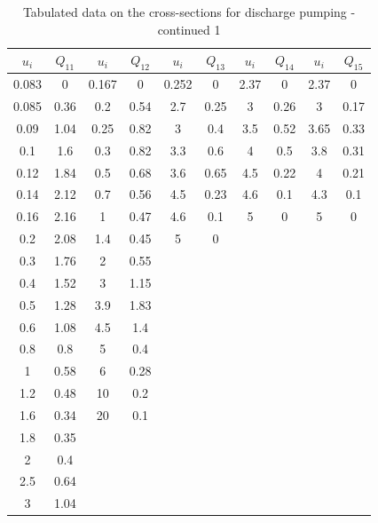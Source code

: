 \documentclass{report}
\begin{document}
\begin{table}
\centering
\caption{Tabulated data on the cross-sections for discharge pumping - continued 1}
\begin{tabular}{|c|c||c|c||c|c||c|c||c|c|}
\hline 
$u_i$ & $Q_{11}$ & $u_i$ & $Q_{12}$ & $u_i$ & $Q_{13}$ & $u_i$ & $Q_{14}$ & $u_i$ & $Q_{15}$ \\
\hline 
0.083 & 0    & 0.167 & 0    & 0.252 & 0    & 2.37 & 0    & 2.37 & 0    \\
0.085 & 0.36 & 0.2   & 0.54 & 2.7   & 0.25 & 3    & 0.26 & 3    & 0.17 \\
0.09  & 1.04 & 0.25  & 0.82 & 3     & 0.4  & 3.5  & 0.52 & 3.65 & 0.33 \\
0.1   & 1.6  & 0.3   & 0.82 & 3.3   & 0.6  & 4    & 0.5  & 3.8  & 0.31 \\
0.12  & 1.84 & 0.5   & 0.68 & 3.6   & 0.65 & 4.5  & 0.22 & 4    & 0.21 \\
0.14  & 2.12 & 0.7   & 0.56 & 4.5   & 0.23 & 4.6  & 0.1  & 4.3  & 0.1  \\
0.16  & 2.16 & 1     & 0.47 & 4.6   & 0.1  & 5    & 0    & 5    & 0    \\
0.2   & 2.08 & 1.4   & 0.45 & 5     & 0    &      &      &      &      \\
0.3   & 1.76 & 2     & 0.55 &       &      &      &      &      &      \\
0.4   & 1.52 & 3     & 1.15 &       &      &      &      &      &      \\
0.5   & 1.28 & 3.9   & 1.83 &       &      &      &      &      &      \\
0.6   & 1.08 & 4.5   & 1.4  &       &      &      &      &      &      \\
0.8   & 0.8  & 5     & 0.4  &       &      &      &      &      &      \\
1     & 0.58 & 6     & 0.28 &       &      &      &      &      &      \\
1.2   & 0.48 & 10    & 0.2  &       &      &      &      &      &      \\
1.6   & 0.34 & 20    & 0.1  &       &      &      &      &      &      \\
1.8   & 0.35 &       &      &       &      &      &      &      &      \\
2     & 0.4  &       &      &       &      &      &      &      &      \\ 
2.5   & 0.64 &       &      &       &      &      &      &      &      \\ 
3     & 1.04 &       &      &       &      &      &      &      &      \\ 

\end{tabular}
\end{table}
\end{document}
